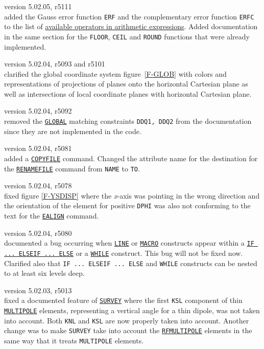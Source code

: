 \begin{madlist}
   version 5.02.05, r5111\\
  added the Gauss error function \texttt{ERF} and the complementary error function 
  \texttt{ERFC} to the list of \hyperref[subsec:operator]{available operators in 
  arithmetic expressions}. Added documentation in the same section for the 
  \texttt{FLOOR}, \texttt{CEIL} and \texttt{ROUND} functions that were already 
  implemented. 
  
  
   version 5.02.04, r5093 and r5101\\
  clarified the global coordinate system figure~\ref{F-GLOB} with colors and 
  representations of projections of planes onto the horizontal Cartesian 
  plane as well as intersections of local coordinate planes with horizontal 
  Cartesian plane. 
  
  
   version 5.02.04, r5092\\
  removed the \hyperref[sec:global]{\texttt{GLOBAL}} matching constraints
  \texttt{DDQ1, DDQ2} from the documentation since they are not
  implemented in the code.  
  
  
   version 5.02.04, r5081\\
  added a \hyperref[sec:copyfile]{\texttt{COPYFILE}} command. Changed the attribute 
  name for the destination for the \hyperref[sec:renamefile]{\texttt{RENAMEFILE}} 
  command from \texttt{NAME} to \texttt{TO}.
  
  
   version 5.02.04, r5078\\
  fixed figure \ref{F-YSDISP} where the \textit{x}-axis was pointing in
  the wrong direction and the orientation of the element for positive
  \texttt{DPHI} was also not conforming to the text for the
  \hyperref[sec:ealign]{\texttt{EALIGN}} command.
  
  
    version 5.02.04, r5080\\
  documented a bug occurring when \hyperref[sec:beamline]{\texttt{LINE}}
  or \hyperref[sec:macro]{\texttt{MACRO}} constructs appear within a
  \hyperref[sec:if]{\texttt{IF ... ELSEIF ... ELSE}} or a 
  \hyperref[sec:while]{\texttt{WHILE}} construct. This bug will not be
  fixed now. \\  
  Clarified also that \texttt{IF ... ELSEIF ... ELSE} and \texttt{WHILE}
  constructs can be nested to at least six levels deep.
  
  
   version 5.02.03, r5013\\
  fixed a documented feature of \hyperref[chap:survey]{\texttt{SURVEY}}
  where the first \texttt{KSL} component of thin
  \hyperref[sec:multipole]{\texttt{MULTIPOLE}} elements, representing a
  vertical angle for a thin dipole, was not taken into account. Both
  \texttt{KNL} and \texttt{KSL} are now properly taken into
  account. Another change was to make \texttt{SURVEY} take into account
  the \hyperref[sec:rfmultipole]{\texttt{RFMULTIPOLE}} elements in the
  same way that it treats \texttt{MULTIPOLE} elements.
  

\end{madlist}
